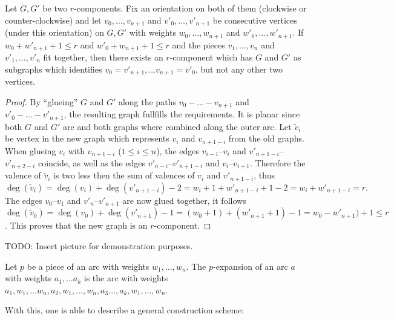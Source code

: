 \begin{lemma}\label{thm:fitting:arcs}
  Let $G, G'$ be two $r$-components. Fix an orientation on both of them (clockwise or counter-clockwise) and let $v_0, \dots, v_{n+1}$ and $v'_0, \dots, v'_{n+1}$ be consecutive vertices (under this orientation) on $G, G'$ with weights $w_0, \dots, w_{n+1}$ and $w'_0, \dots, w'_{n+1}$. If $w_0 + w'_{n+1} + 1 \leq r$ and $w'_0 + w_{n+1} + 1 \leq r$ and the pieces $v_1, \dots, v_n$ and $v'_1, \dots, v'_n$ fit together, then there exists an $r$-component which has $G$ and $G'$ as subgraphs which identifies $v_0 = v'_{n+1}, \dots v_{n+1} = v'_0$, but not any other two vertices.
  \begin{proof}
    By ``glueing'' $G$ and $G'$ along the paths $v_0 - \dots - v_{n+1}$ and $v'_0 - \dots - v'_{n+1}$, the resulting graph fullfills the requirements. It is planar since both $G$ and $G'$ are and both graphs where combined along the outer arc. Let $\tilde{v}_i$ be vertex in the new graph which represents $v_i$ and $v_{n+1-i}$ from the old graphs. When glueing $v_i$ with $v_{n+1-i}$ ($1 \leq i \leq n$), the edges $v_{i-1}$--$v_i$ and $v'_{n + 1 - i}$--$v'_{n + 2 - i}$ coincide, as well as the edges $v'_{n - i}$--$v'_{n + 1 - i}$ and $v_i$--$v_{i+1}$. Therefore the valence of $\tilde{v}_i$ is two less then the sum of valences of $v_i$ and $v'_{n+1-i}$, thus
    \begin{equation*}
      \deg(\tilde{v}_i) = \deg(v_i) + \deg(v'_{n+1-i}) - 2 = w_i + 1 + w'_{n + 1 - i} + 1 - 2 = w_i + w'_{n + 1 - i} = r.
    \end{equation*}
    The edges $v_0$--$v_1$ and $v'_n$--$v'_{n+1}$ are now glued together, it follows $\deg(\tilde{v}_0) = \deg(v_0) + \deg(v'_{n+1}) - 1 = (w_0 + 1) + (w'_{n+1} + 1) - 1 = w_0 - w'_{n+1}) + 1 \leq r$. This proves that the new graph is an $r$-component.
  \end{proof}
\end{lemma}

TODO: Insert picture for demonstration purposes.

\begin{definition}
  Let $p$ be a piece of an arc with weights $w_1, \dots, w_{n}$. The $p$-expansion of an arc $a$ with weights $a_1, \dots a_k$ is the arc with weights $a_1, w_1, \dots w_n, a_2, w_1, \dots, w_n, a_3 \dots, a_k, w_1, \dots, w_n$.
\end{definition}

With this, one is able to describe a general construction scheme:

